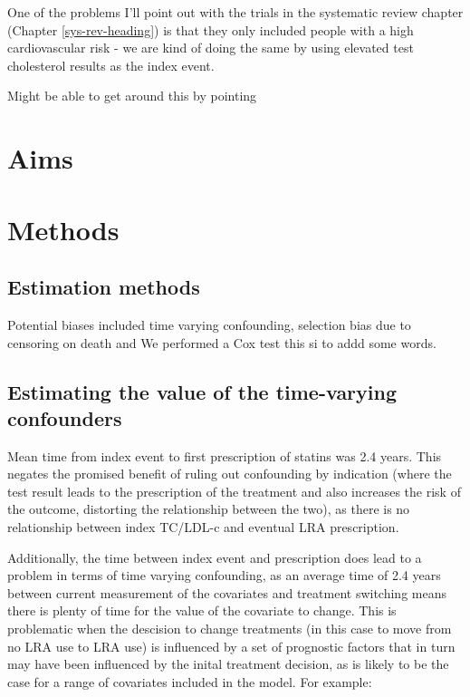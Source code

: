 \documentclass[a4paper, nobind]{templates/ociamthesis}
\begin{document}
One of the problems I'll point out with the trials in the systematic review chapter (Chapter \ref{sys-rev-heading}) is that they only included people with a high cardiovascular risk - we are kind of doing the same by using elevated test cholesterol results as the index event.

Might be able to get around this by pointing

\hypertarget{aims-1}{%
\section{Aims}\label{aims-1}}

\hypertarget{methods-1}{%
\section{Methods}\label{methods-1}}

\hypertarget{estimation-methods}{%
\subsection{Estimation methods}\label{estimation-methods}}

Potential biases included time varying confounding, selection bias due to censoring on death and
We performed a Cox test this si to addd some words.

\hypertarget{estimating-the-value-of-the-time-varying-confounders}{%
\subsection{Estimating the value of the time-varying confounders}\label{estimating-the-value-of-the-time-varying-confounders}}

Mean time from index event to first prescription of statins was 2.4 years. This negates the promised benefit of ruling out confounding by indication (where the test result leads to the prescription of the treatment and also increases the risk of the outcome, distorting the relationship between the two), as there is no relationship between index TC/LDL-c and eventual LRA prescription.

Additionally, the time between index event and prescription does lead to a problem in terms of time varying confounding, as an average time of 2.4 years between current measurement of the covariates and treatment switching means there is plenty of time for the value of the covariate to change. This is problematic when the descision to change treatments (in this case to move from no LRA use to LRA use) is influenced by a set of prognostic factors that in turn may have been influenced by the inital treatment decision, as is likely to be the case for a range of covariates included in the model. For example:
\end{document}
